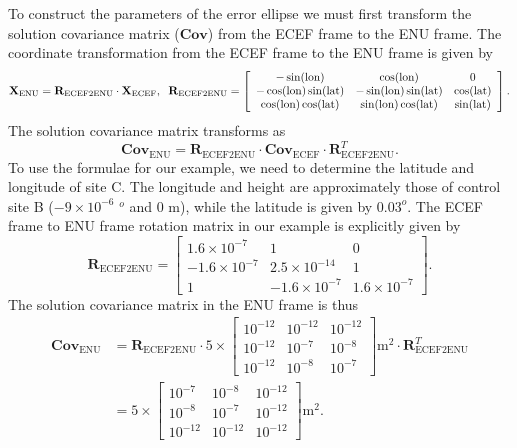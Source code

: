To construct the parameters of the error ellipse we must first transform the solution covariance matrix ($\mathbf{Cov}$) from the ECEF frame to the ENU frame.  The coordinate transformation from the ECEF frame to the ENU frame is given by
\begin{equation} \label{eq:ECEF2ENU}
\mathbf{X}_{\text{ENU}}=\mathbf{R}_{\text{ECEF2ENU}}\cdot\mathbf{X}_{\text{ECEF}},\hspace*{2mm}\mathbf{R}_{\text{ECEF2ENU}}=\left[\begin{array}{cccc}-\sin(\text{lon})&\cos(\text{lon})&0\\-\cos(\text{lon})\sin(\text{lat})&-\sin(\text{lon})\sin(\text{lat})&\cos(\text{lat})\\\cos(\text{lon})\cos(\text{lat})&\sin(\text{lon})\cos(\text{lat})&\sin(\text{lat})\end{array}\right].
\end{equation}
The solution covariance matrix transforms as
\begin{equation}
\mathbf{Cov}_{\text{ENU}}=\textbf{R}_{\text{ECEF2ENU}}\cdot\mathbf{Cov}_{\text{ECEF}}\cdot\mathbf{R}_{\text{ECEF2ENU}}^T.
\end{equation}
To use the formulae for our example, we need to determine the latitude and longitude of site C.  The longitude and height are approximately those of control site B ($-9\times10^{-6}$ $^o$ and $0$ m), while the latitude is given by $0.03^o$.  The ECEF frame to ENU frame rotation matrix in our example is explicitly given by
\begin{equation}
\mathbf{R}_{\text{ECEF2ENU}}=\left[\begin{array}{cccc}1.6\times10^{-7}&1&0\\-1.6\times10^{-7}&2.5\times10^{-14}&1\\1&-1.6\times10^{-7}&1.6\times10^{-7}\end{array}\right].
\end{equation}
The solution covariance matrix in the ENU frame is thus
\begin{equation}
\begin{split}
\mathbf{Cov}_{\text{ENU}}&=\mathbf{R}_{\text{ECEF2ENU}}\cdot5\times\left[\begin{array}{ccc}10^{-12}&10^{-12}&10^{-12}\\10^{-12}&10^{-7}&10^{-8}\\10^{-12}&10^{-8}&10^{-7}\end{array}\right]\text{m}^2\cdot\mathbf{R}_{\text{ECEF2ENU}}^T\\
&=5\times\left[\begin{array}{ccc}10^{-7}&10^{-8}&10^{-12}\\10^{-8}&10^{-7}&10^{-12}\\10^{-12}&10^{-12}&10^{-12}\end{array}\right]\text{m}^2.
\end{split}
\end{equation}

